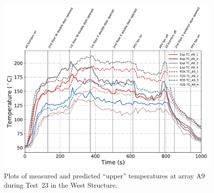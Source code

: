 \begin{figure}[!h]
	\centering
	\includegraphics[width=\columnwidth]{Figures/Plots/Validation/Temperature/Test_23_TC_A9_upper}
	\caption{Plots of measured and predicted ``upper'' temperatures at array A9 during Test~23 in the West Structure.}
	\label{fig:TCA9_upper_data_Test23}
\end{figure}

